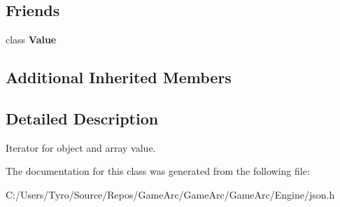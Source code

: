 \subsection*{Friends}
\begin{DoxyCompactItemize}
\item 
\mbox{\label{class_json_1_1_value_iterator_aeceedf6e1a7d48a588516ce2b1983d6f}} 
class {\bfseries Value}
\end{DoxyCompactItemize}
\subsection*{Additional Inherited Members}


\subsection{Detailed Description}
Iterator for object and array value. 

The documentation for this class was generated from the following file\+:\begin{DoxyCompactItemize}
\item 
C\+:/\+Users/\+Tyro/\+Source/\+Repos/\+Game\+Arc/\+Game\+Arc/\+Game\+Arc/\+Engine/json.\+h\end{DoxyCompactItemize}
